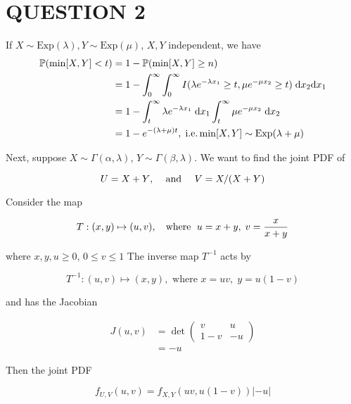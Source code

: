 \documentclass[a4paper]{article}
\begin{document}
	
\maketitle



\section{QUESTION 2}

If $ X \sim \text{Exp}(\lambda), Y \sim \text{Exp}(\mu)  $, $ X,Y $ independent, we have 
	\begin{align*}
	\mathbb{P} (\min[X,Y] < t) & =  1 - \mathbb{P} (\min[X,Y] \geq n) \\
	& = 1 - \int_{0}^{\infty} \int_{0}^{\infty} I(\lambda e^{-\lambda x_{1}} \geq t, \mu e^{-\mu x_{2}} \geq t ) \; \mathrm{d} x_{2} \mathrm{d} x_{1} \\
	& = 1 - \int_{t}^{\infty} \lambda e^{-\lambda x_{1}} \; \mathrm{d} x_{1} \int_{t}^{\infty} \mu e^{-\mu x_{2}} \; \mathrm{d} x_{2} \\
	& = 1 - e^{-(\lambda + \mu) t}, \; \text{i.e.} \min[X,Y] \sim \text{Exp}(\lambda + \mu)
	\end{align*}
	
	
 


	Next, suppose $ X \sim \Gamma(\alpha,\lambda) $, $ Y \sim \Gamma(\beta,\lambda)  $. We want to find the joint PDF of
	
	\[ U = X + Y \text{, \quad and \quad } V = X / (X + Y) \]
	
	Consider the map 
	
	\[ T: (x,y) \mapsto (u,v), \text{ \; where \;} u = x + y, \; v = \frac{x}{x + y} \]
	
	where $ x,y,u \geq 0 $, $ 0 \leq v \leq 1 $ The inverse map $ T^{-1} $ acts by
	
	\[ T^{-1}: (u,v) \mapsto (x,y), \text{ where } x = uv, \; y = u(1-v) \]
	
	and has the Jacobian
	
	\begin{align*}
	J(u,v) & = \det \begin{pmatrix}
	v & u \\
	1 - v & -u 
	\end{pmatrix}  \\
	& = -u
	\end{align*}
	
	Then the joint PDF
	
	\[ f_{U,V}(u,v) = f_{X,Y}(uv,u(1-v))\left| -u \right|  \]
	
\end{document}
